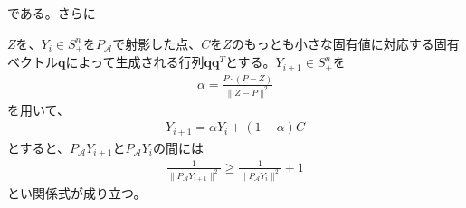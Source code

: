 である。さらに
\begin{lemma} \label{Increment}
  $Z$を、$Y_i \in S_+^n$を$P_\mathcal{A}$で射影した点、$C$を$Z$のもっとも小さな固有値に対応する固有ベクトル$\mathbf{q}$によって生成される行列$\mathbf{q} \mathbf{q}^T$とする。$Y_{i + 1} \in S_+^n$を
  \begin{align*}
    \alpha = \frac{P \cdot (P - Z)}{\|Z - P\|^2}
  \end{align*}
  を用いて、
  \begin{align*}
    Y_{i + 1} = \alpha Y_i + (1 - \alpha) C
  \end{align*}
  とすると、$P_\mathcal{A} Y_{i + 1}$と$P_\mathcal{A} Y_i$の間には
  \begin{align*}
    \frac{1}{\|P_\mathcal{A} Y_{i + 1}\|^2} \geq \frac{1}{\|P_\mathcal{A} Y_i\|^2} + 1
  \end{align*}
  とい関係式が成り立つ。
\end{lemma}
